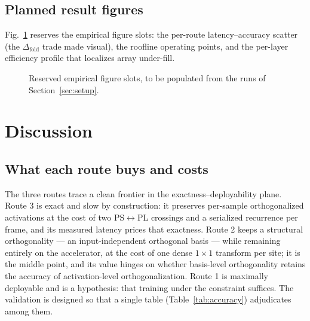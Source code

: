 \documentclass[onecolumn,journal]{IEEEtran}
\begin{document}
\subsection{Planned result figures}
Fig.~\ref{fig:pendingpanels} reserves the empirical figure slots: the per-route
latency--accuracy scatter (the $\Delta_{\mathrm{fold}}$ trade made visual), the
roofline operating points, and the per-layer efficiency profile that localizes array
under-fill.

\begin{figure}[t]
\centering
{}
\caption{Reserved empirical figure slots, to be populated from the runs of
Section~\ref{sec:setup}.}
\label{fig:pendingpanels}
\end{figure}

\section{Discussion}\label{sec:discussion}

\subsection{What each route buys and costs}
The three routes trace a clean frontier in the exactness--deployability plane. Route 3
is exact and slow by construction: it preserves per-sample orthogonalized activations
at the cost of two PS$\leftrightarrow$PL crossings and a serialized recurrence per
frame, and its measured latency prices that exactness. Route 2 keeps a structural
orthogonality --- an input-independent orthogonal basis --- while remaining entirely
on the accelerator, at the cost of one dense $1{\times}1$ transform per site; it is
the middle point, and its value hinges on whether basis-level orthogonality retains
the accuracy of activation-level orthogonalization. Route 1 is maximally deployable
and is a hypothesis: that training under the constraint suffices. The validation is
designed so that a single table (Table~\ref{tab:accuracy}) adjudicates among them.
\end{document}
